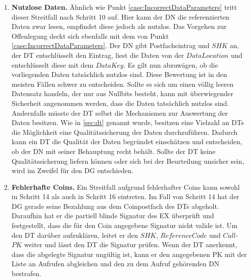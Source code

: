 \documentclass[
	fontsize=11pt,
	headings=small,
	parskip=half,           %
	bibliography=totoc,
	numbers=noenddot,       %
	open=any,               %
]{scrreprt}
\begin{document}
\begin{enumerate}
    \item \textbf{Nutzlose Daten.}\label{case:UselessData}
    Ähnlich wie Punkt \ref{case:IncorrectDataParameters} tritt dieser Streitfall nach Schritt 10 auf. Hier kann der DN die referenzierten Daten zwar lesen, empfindet diese jedoch als nutzlos. Das Vorgehen zur Offenlegung deckt sich ebenfalls mit dem von Punkt \ref{case:IncorrectDataParameters}. Der DN gibt Postfacheintrag und $SHK$ an, der DT entschlüsselt den Eintrag, liest die Daten von der $DataLocation$ und entschlüsselt diese mit dem $DataKey$. Es gilt nun abzuwägen, ob die vorliegenden Daten tatsächlich nutzlos sind. Diese Bewertung ist in den meisten Fällen schwer zu entscheiden. Sollte es sich um einen völlig leeren Datensatz handeln, der nur aus Nullbits besteht, kann mit überwiegender Sicherheit angenommen werden, dass die Daten tatsächlich nutzlos sind. Andernfalls müsste der DT selbst die Mechanismen zur Auswertung der Daten besitzen. Wie in \ref{sec:dt} genannt wurde, besitzen eine Vielzahl an DTs die Möglichkeit eine Qualitätssicherung der Daten durchzuführen. Dadurch kann ein DT die Qualität der Daten begründet einschätzen und entscheiden, ob der DN mit seiner Behauptung recht behält. Sollte der DT keine Qualitätssicherung liefern können oder sich bei der Beurteilung unsicher sein, wird im Zweifel für den DG entschieden.

    \item \textbf{Fehlerhafte Coins.}\label{case:IncorrectCoins}
    Ein Streitfall aufgrund fehlerhafter Coins kann sowohl in Schritt 14 als auch in Schritt 16 eintreten. Im Fall von Schritt 14 hat der DG gerade seine Bezahlung aus dem Coinpostfach des DTs abgeholt. Daraufhin hat er die partiell blinde Signatur des EX überprüft und festgestellt, dass die für den Coin angegebene Signatur nicht valide ist. Um den DT darüber aufzuklären, leitet er den $SHK$, $ReferenceCode$ und $Call$-$PK$ weiter und lässt den DT die Signatur prüfen. Wenn der DT anerkennt, dass die abgelegte Signatur ungültig ist, kann er den angegebenen PK mit der Liste an Aufrufen abgleichen und den zu dem Aufruf gehörenden DN bestrafen.\\
    

\end{enumerate}
\end{document}

